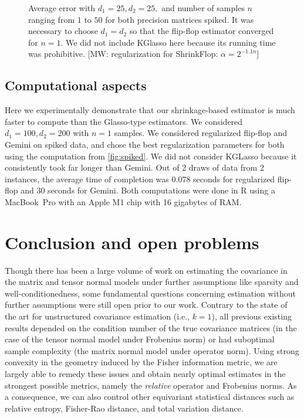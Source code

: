 \documentclass[aos]{imsart}
\theoremstyle{definition}
\numberwithin{equation}{section}
\newcommand{\MW}[1]{{\color{red}[MW: #1]}}
\newcommand{\MW}[1]{{}}
\begin{document}
\begin{figure}
\begin{subfigure}[b]{.4\textwidth}
         \end{subfigure}
\caption{Average error with $d_1 = 25, d_2 = 25, $ and number of samples $n$ ranging from $1$ to $50$ for both precision matrices spiked. It was necessary to choose $d_1 = d_2$ so that the flip-flop estimator converged for $n = 1$. We did not include KGlasso here because its running time was prohibitive. \MW{regularization for ShrinkFlop: $\alpha = 2^{-1.1n}$}\label{fig:lc}}
\end{figure}

\subsection{Computational aspects}
Here we experimentally demonstrate that our shrinkage-based estimator is much faster to compute than the Glasso-type estimators. We considered $d_1 =100, d_2 = 200$ with $n = 1$ samples. We considered regularized flip-flop and Gemini on spiked data, and chose the best regularization parameters for both using the computation from \cref{fig:spiked}. We did not consider KGLasso because it consistently took far longer than Gemini. Out of 2 draws of data from 2 instances, the average time of completion was 0.078 seconds for regularized flip-flop and 30 seconds for Gemini. Both computations were done in R using a MacBook~Pro with an Apple M1 chip with 16 gigabytes of RAM.

\section{Conclusion and open problems}
Though there has been a large volume of work on estimating the covariance in the matrix and tensor normal models under further assumptions like sparsity and well-conditionedness, some fundamental questions concerning estimation without further assumptions were still open prior to our work.
Contrary to the state of the art for unstructured covariance estimation (i.e., $k = 1$), all previous existing results depended on the condition number of the true covariance matrices (in the case of the tensor normal model under Frobenius norm) or had suboptimal sample complexity (the matrix normal model under operator norm).
Using strong convexity in the geometry induced by the Fisher information metric, we are largely able to remedy these issues and obtain nearly optimal estimates in the strongest possible metrics, namely the \emph{relative} operator and Frobenius norms.
As a consequence, we can also control other equivariant statistical distances such as relative entropy, Fisher-Rao distance, and total variation distance.
\end{document}
